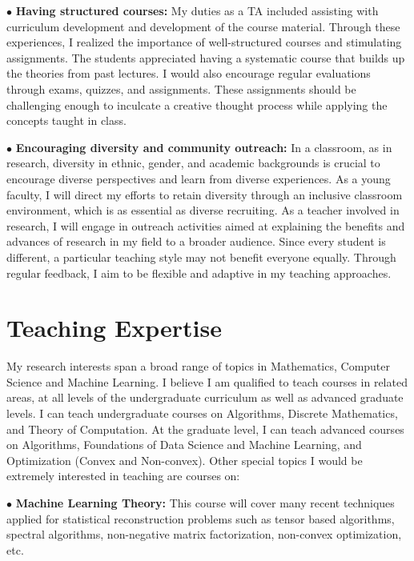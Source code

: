 \documentclass[11pt,a4paper,sans]{moderncv} %
\begin{document}
$\bullet{}$ \textbf{Having structured courses:} My duties as a TA  included assisting with curriculum development and development of the course material. Through these experiences, I realized the importance of well-structured courses and stimulating assignments. The students appreciated having a systematic course that builds up the theories from past lectures. I would also encourage regular evaluations through exams, quizzes, and assignments. These assignments should be challenging enough to inculcate a creative thought process while applying the concepts taught in class.

$\bullet{}$ \textbf{Encouraging diversity and community outreach:} In a classroom, as in research, diversity in ethnic, gender, and academic backgrounds is crucial to encourage diverse perspectives and learn from diverse experiences. As a young faculty, I will direct my efforts to retain diversity through an inclusive classroom environment, which is as essential as diverse recruiting. As a teacher involved in research, I will engage in outreach activities aimed at explaining the benefits and advances of research in my field to a broader audience. Since every student is different, a particular teaching style may not benefit everyone equally. Through regular feedback, I aim to be flexible and adaptive in my teaching approaches.

\newpage 

\section{Teaching Expertise}

My research interests span a broad range of topics in Mathematics, Computer Science and Machine Learning. I believe I am qualified to teach courses in related areas, at all levels of the undergraduate curriculum as well as advanced graduate levels. I can teach undergraduate courses on Algorithms, Discrete Mathematics, and Theory of Computation. At the graduate level, I can teach advanced courses on Algorithms, Foundations of Data Science and Machine Learning, and Optimization (Convex and Non-convex). Other special topics I would be extremely interested in teaching are courses on:


$\bullet{}$ \textbf{Machine Learning Theory:} This course will cover many recent techniques applied for statistical reconstruction problems such as tensor based algorithms, spectral algorithms, non-negative matrix factorization, non-convex optimization, etc.
\end{document}
